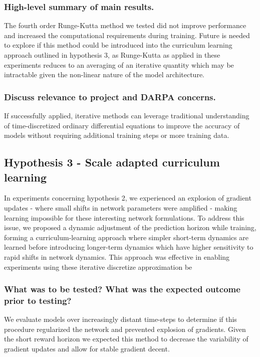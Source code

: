 \documentclass[12pt]{article}
\theoremstyle{plain}
\theoremstyle{remark}
\theoremstyle{definition}
\begin{document}
\subsubsection{High-level summary of main results.}
	The fourth order Runge-Kutta method we tested did not improve performance and increased the computational requirements during training. Future is needed to explore if this method could be introduced into the curriculum learning approach outlined in hypothesis 3, as Runge-Kutta as applied in these experiments reduces to an averaging of an iterative quantity which may be intractable given the non-linear nature of the model architecture.


\subsubsection{Discuss relevance to project and DARPA concerns.}
	If successfully applied, iterative methods can leverage traditional understanding of time-discretized ordinary differential equations to improve the accuracy of models without requiring additional training steps or more training data.


\subsection{Hypothesis 3 - Scale adapted curriculum learning}

In experiments concerning hypothesis 2, we experienced an explosion of gradient updates - where small shifts in network parameters were amplified - making learning impossible for these interesting network formulations. To address this issue, we proposed a dynamic adjustment of the prediction horizon while training, forming a curriculum-learning approach where simpler short-term dynamics are learned before introducing longer-term dynamics which have higher sensitivity to rapid shifts in network dynamics. This approach was effective in enabling experiments using these iterative discretize approximation be  


\subsubsection{What was to be tested? What was the expected outcome prior to testing?}
	We evaluate models over increasingly distant time-steps to determine if this procedure regularized the network and prevented explosion of gradients. Given the short reward horizon we expected this method to decrease the variability of gradient updates and allow for stable gradient decent.
\end{document}

